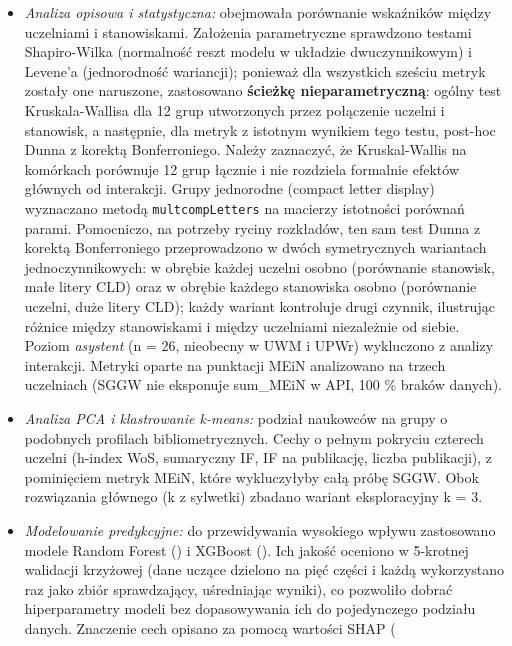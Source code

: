 \documentclass[
  polish,
  12pt,
  a4paper,
]{article}
\providecommand{\tightlist}{%
  \setlength{\itemsep}{0pt}\setlength{\parskip}{0pt}}
\begin{document}
\begin{itemize}
\tightlist
\item
  \emph{Analiza opisowa i statystyczna:} obejmowała porównanie
  wskaźników między uczelniami i stanowiskami. Założenia parametryczne
  sprawdzono testami Shapiro-Wilka (normalność reszt modelu w układzie
  dwuczynnikowym) i Levene'a (jednorodność wariancji); ponieważ dla
  wszystkich sześciu metryk zostały one naruszone, zastosowano
  \textbf{ścieżkę nieparametryczną}: ogólny test Kruskala-Wallisa dla 12
  grup utworzonych przez połączenie uczelni i stanowisk, a następnie,
  dla metryk z istotnym wynikiem tego testu, post-hoc Dunna z korektą
  Bonferroniego. Należy zaznaczyć, że Kruskal-Wallis na komórkach
  porównuje 12 grup łącznie i nie rozdziela formalnie efektów głównych
  od interakcji. Grupy jednorodne (compact letter display) wyznaczano
  metodą \texttt{multcompLetters} na macierzy istotności porównań
  parami. Pomocniczo, na potrzeby ryciny rozkładów, ten sam test Dunna z
  korektą Bonferroniego przeprowadzono w dwóch symetrycznych wariantach
  jednoczynnikowych: w obrębie każdej uczelni osobno (porównanie
  stanowisk, małe litery CLD) oraz w obrębie każdego stanowiska osobno
  (porównanie uczelni, duże litery CLD); każdy wariant kontroluje drugi
  czynnik, ilustrując różnice między stanowiskami i między uczelniami
  niezależnie od siebie. Poziom \emph{asystent} (n = 26, nieobecny w UWM
  i UPWr) wykluczono z analizy interakcji. Metryki oparte na punktacji
  MEiN analizowano na trzech uczelniach (SGGW nie eksponuje sum\_MEiN w
  API, 100 \% braków danych).
\item
  \emph{Analiza PCA i klastrowanie k-means:} podział naukowców na grupy
  o podobnych profilach bibliometrycznych. Cechy o pełnym pokryciu
  czterech uczelni (h-index WoS, sumaryczny IF, IF na publikację, liczba
  publikacji), z pominięciem metryk MEiN, które wykluczyłyby całą próbę
  SGGW. Obok rozwiązania głównego (k z sylwetki) zbadano wariant
  eksploracyjny k = 3.
\item
  \emph{Modelowanie predykcyjne:} do przewidywania wysokiego wpływu
  zastosowano modele Random Forest () i XGBoost (). Ich
  jakość oceniono w 5-krotnej walidacji krzyżowej (dane uczące dzielono
  na pięć części i każdą wykorzystano raz jako zbiór sprawdzający,
  uśredniając wyniki), co pozwoliło dobrać hiperparametry modeli bez
  dopasowywania ich do pojedynczego podziału danych. Znaczenie cech
  opisano za pomocą wartości SHAP (
\end{itemize}
\end{document}
